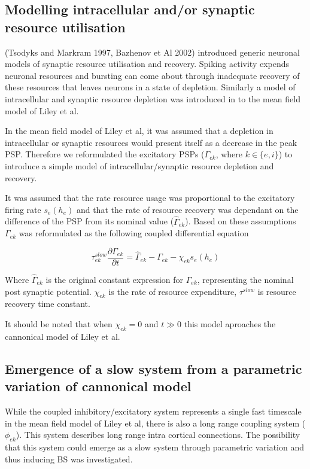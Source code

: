 \documentclass[a4paper,12pt]{article}
\begin{document}
\subsection{Modelling intracellular and/or synaptic resource utilisation}
(Tsodyks and Markram 1997, Bazhenov et Al 2002) introduced generic neuronal models of synaptic resource utilisation and recovery. Spiking activity expends neuronal resources and bursting can come about through inadequate recovery of these resources that leaves neurons in a state of depletion.  Similarly a model of intracellular and synaptic resource depletion was introduced in to the mean field model of Liley et al. 

In the mean field model of Liley et al, it was assumed that a depletion in intracellular or synaptic resources would present itself as a decrease in the peak PSP. Therefore we reformulated the excitatory PSPs ($\Gamma_{ek}$, where $k \in \{e, i\}$) to
introduce a simple model of intracellular/synaptic resource depletion and recovery.

It was assumed that the rate resource usage was proportional to the excitatory firing rate $s_e(h_e)$ and that the rate of resource recovery was dependant on the difference of the PSP from its nominal value ($\hat{\Gamma}_{ek}$). Based on these assumptions $\Gamma_{ek}$ was reformulated as the following coupled differential equation


\begin{equation} \label{eq:Gamma_ek}
{\tau^{slow}_{ek}} \frac{\partial{\Gamma_{ek}}}{\partial{t}} = \hat{\Gamma}_{ek} - \Gamma_{ek} - \chi_{ek} s_e(h_e)
\end{equation}

\noindent
Where $\hat{\Gamma}_{ek}$ is the original constant expression for $\Gamma_{ek}$, representing the nominal post synaptic potential. $\chi_{ek}$ is the rate of resource expenditure, $\tau^{slow}$ is resource recovery time constant.

It should be noted that when $\chi_{ek}=0$ and $t \gg 0$ this model aproaches the cannonical model of Liley et al.

\subsection{Emergence of a slow system from a parametric variation of cannonical model}
While the coupled inhibitory/excitatory system represents a single fast timescale in the mean field model of Liley et al, there is also a long range coupling system ($\phi_{ek}$). This system describes long range intra cortical connections. The possibility that this system could emerge as a slow system through parametric variation and thus inducing BS was investigated.
\end{document}
